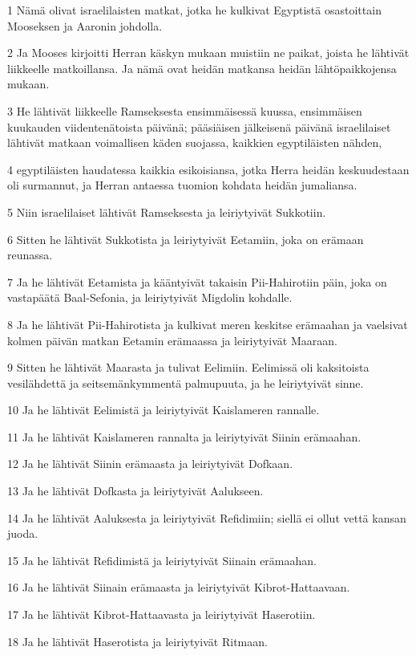 \par 1 Nämä olivat israelilaisten matkat, jotka he kulkivat Egyptistä osastoittain Mooseksen ja Aaronin johdolla.
\par 2 Ja Mooses kirjoitti Herran käskyn mukaan muistiin ne paikat, joista he lähtivät liikkeelle matkoillansa. Ja nämä ovat heidän matkansa heidän lähtöpaikkojensa mukaan.
\par 3 He lähtivät liikkeelle Ramseksesta ensimmäisessä kuussa, ensimmäisen kuukauden viidentenätoista päivänä; pääsiäisen jälkeisenä päivänä israelilaiset lähtivät matkaan voimallisen käden suojassa, kaikkien egyptiläisten nähden,
\par 4 egyptiläisten haudatessa kaikkia esikoisiansa, jotka Herra heidän keskuudestaan oli surmannut, ja Herran antaessa tuomion kohdata heidän jumaliansa.
\par 5 Niin israelilaiset lähtivät Ramseksesta ja leiriytyivät Sukkotiin.
\par 6 Sitten he lähtivät Sukkotista ja leiriytyivät Eetamiin, joka on erämaan reunassa.
\par 7 Ja he lähtivät Eetamista ja kääntyivät takaisin Pii-Hahirotiin päin, joka on vastapäätä Baal-Sefonia, ja leiriytyivät Migdolin kohdalle.
\par 8 Ja he lähtivät Pii-Hahirotista ja kulkivat meren keskitse erämaahan ja vaelsivat kolmen päivän matkan Eetamin erämaassa ja leiriytyivät Maaraan.
\par 9 Sitten he lähtivät Maarasta ja tulivat Eelimiin. Eelimissä oli kaksitoista vesilähdettä ja seitsemänkymmentä palmupuuta, ja he leiriytyivät sinne.
\par 10 Ja he lähtivät Eelimistä ja leiriytyivät Kaislameren rannalle.
\par 11 Ja he lähtivät Kaislameren rannalta ja leiriytyivät Siinin erämaahan.
\par 12 Ja he lähtivät Siinin erämaasta ja leiriytyivät Dofkaan.
\par 13 Ja he lähtivät Dofkasta ja leiriytyivät Aalukseen.
\par 14 Ja he lähtivät Aaluksesta ja leiriytyivät Refidimiin; siellä ei ollut vettä kansan juoda.
\par 15 Ja he lähtivät Refidimistä ja leiriytyivät Siinain erämaahan.
\par 16 Ja he lähtivät Siinain erämaasta ja leiriytyivät Kibrot-Hattaavaan.
\par 17 Ja he lähtivät Kibrot-Hattaavasta ja leiriytyivät Haserotiin.
\par 18 Ja he lähtivät Haserotista ja leiriytyivät Ritmaan.
